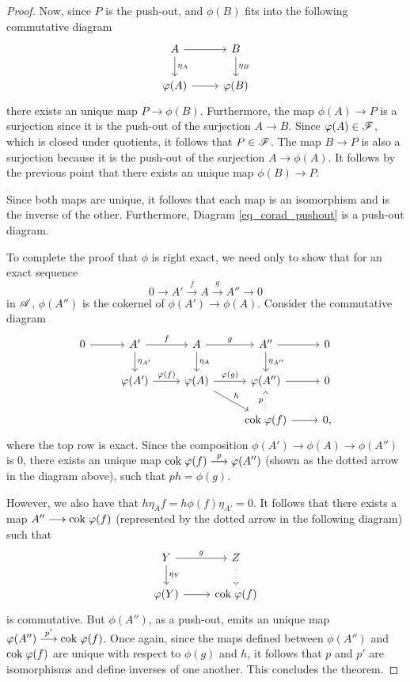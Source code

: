 \begin{proof}
Now, since $P$ is the push-out, and $\phi(B)$ fits into the 
following commutative diagram
\begin{equation}\label{eq_corad_pushout}
\begin{tikzcd}
A \arrow{r} \arrow{d}{\eta_A} & B \arrow{d}{\eta_B} \\
\phi(A) \arrow{r} &\phi(B)
\end{tikzcd}
\end{equation}
there exists an unique map $P \to \phi(B)$. Furthermore, the map 
$\phi(A) \to P$ is a surjection since it is the push-out of the 
surjection $A \to B$. Since $\varphi(A) \in \mathscr{F}$, which is closed 
under quotients, it follows that $P \in \mathscr{F}$. The map $B \to 
P$ is also a surjection because it is the push-out of the 
surjection $A \to \phi(A)$. It follows by the previous point that 
there exists an unique map $\phi(B) \to P$.

Since both maps are unique, it follows that each map is an 
isomorphism and is the inverse of the other. Furthermore,
Diagram \eqref{eq_corad_pushout} is a push-out diagram.

To complete the proof that $\phi$ is right exact, we need only to 
show that for an exact sequence 
\[
0 \to A' \stackrel{f}{\to} A \stackrel{g}{\to} A'' \to 0
\] 
in $\mathscr{A}$, $\phi(A'')$ is the cokernel of $\phi(A') \to 
\phi(A)$. Consider the commutative diagram
\[
\begin{tikzcd}
0 \arrow{r} & 
A' \arrow{r}{f} \arrow{d}{\eta_{A'}} &
A \arrow{r}{g} \arrow{d}{\eta_A}&
A'' \arrow{r}\arrow{d}{\eta_{A''}} &
0 \\
& \phi(A') \arrow{r}{\phi(f)} &
\phi(A) \arrow{r}{\phi(g)} \arrow{rd}{h} &
\phi(A'') \arrow{r} &
0 \\
& & & \cok \phi(f) \arrow[dotted]{u}{p} \arrow{r} &0,
\end{tikzcd}
\]
where the top row is exact. Since the composition $\phi(A') \to 
\phi(A) \to \phi(A'')$ is 0, there exists an unique map $\mathrm{cok}\; 
\varphi(f) \stackrel{p}{\longrightarrow} \varphi(A'')$ (shown as the dotted arrow in 
the diagram above), such that $ph = \phi(g)$.

However, we also have that $h \eta_A f = h \phi(f) \eta_{A'} = 0$.
It follows that there exists a map $A'' \longrightarrow \mathrm{cok}\; \varphi(f)$ 
(represented by the dotted arrow in the following diagram) such 
that
\[
\begin{tikzcd}
Y \arrow{r}{g}\arrow{d}{\eta_Y} & Z \arrow[dotted]{d} \\
\phi(Y) \arrow{r} &\cok \phi(f)
\end{tikzcd}
\]
is commutative. But $\phi(A'')$, as a push-out, emits an unique map
$\varphi(A'') \stackrel{p'}{\longrightarrow} \mathrm{cok}\; \varphi(f)$. Once again, since the 
maps defined between $\phi(A'')$ and $\mathrm{cok}\; \varphi(f)$ are unique with
respect to $\phi(g)$ and $h$, it follows that $p$ and $p'$ are 
isomorphisms and define inverses of one another. This concludes 
the theorem.
\end{proof}

